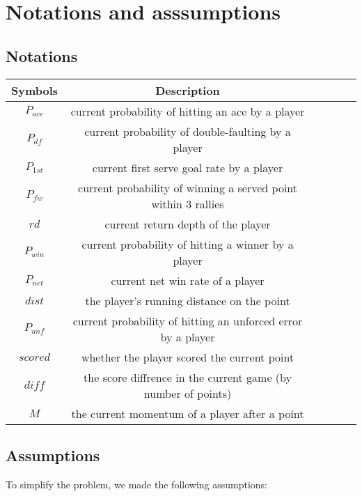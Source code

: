 \section{Notations and asssumptions}
\subsection{Notations}

\begin{table}[!h]
\centering
\begin{tabular}{cccccc}
    
    \toprule
    Symbols & Description \\ 
    \midrule
    $P_{ace}$ & current probability of hitting an ace by a player \\
    $P_{df}$ & current probability of double-faulting by a player \\
    $P_{1st}$ & current first serve goal rate by a player \\
    $P_{fw}$ & current probability of winning a served point within 3 rallies \\
    $rd$ & current return depth of the player \\
    $P_{win}$ & current probability of hitting a winner by a player \\
    $P_{net}$ & current net win rate of a player \\
    $dist$ & the player's running distance on the point \\
    $P_{unf}$ & current probability of hitting an unforced error by a player \\
    $scored$ & whether the player scored the current point \\
    $diff$ & the score diffrence in the current game (by number of points) \\
    $M$ & the current momentum of a player after a point \\

    \bottomrule
\end{tabular}
\end{table}

\subsection{Assumptions}

To simplify the problem, we made the following assumptions:

